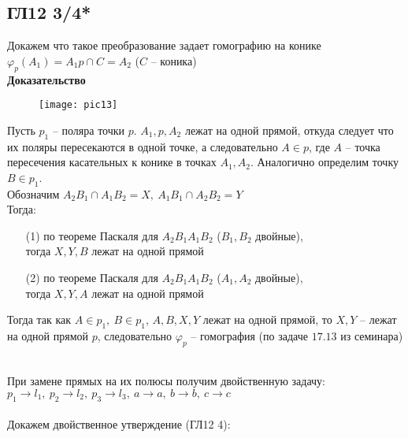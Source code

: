 \subsection*{ГЛ12 3/4*}
Докажем что такое преобразование задает гомографию на конике $\varphi_p(A_1) = A_1p \cap C = A_2$ ($C$ -- коника)\\
\textbf{Доказательство}\\
\begin{wrapfigure}{r}{0.4\textwidth}
	\texttt{[image: pic13]}
\end{wrapfigure}
Пусть $p_1$ -- поляра точки $p$. $A_1, p, A_2$ лежат на одной прямой, откуда следует что их поляры пересекаются в одной точке, а следовательно $A \in p$, где $A$ -- точка пересечения касательных к конике в точках $A_1, A_2$. Аналогично определим точку $B \in p_1$.\\
Обозначим $A_2B_1 \cap A_1B_2 = X,\ A_1B_1 \cap A_2B_2 = Y$\\
Тогда:
\begin{enumerate}
\item[(1)] по теореме Паскаля для $A_2B_1A_1B_2$ ($B_1, B_2$ двойные),\\ тогда $X,Y,B$ лежат на одной прямой
\item[(2)] по теореме Паскаля для $A_2B_1A_1B_2$ ($A_1, A_2$ двойные),\\ тогда $X,Y,A$ лежат на одной прямой
\end{enumerate}
Тогда так как $A \in p_1,\ B \in p_1$, $A,B,X,Y$ лежат на одной прямой, то $X,Y$ -- лежат на одной прямой $p$, следовательно $\varphi_p$ -- гомография (по задаче $17.13$ из семинара)\\
\begin{figure}[h!]
	\begin{minipage}[h]{0.5\linewidth}
	\end{minipage}
	\hfill
	\begin{minipage}[h]{0.5\linewidth}
	\end{minipage}
\end{figure}\\
При замене прямых на их полюсы получим двойственную задачу:\\
$p_1 \to l_1,\ p_2 \to l_2,\ p_3 \to l_3,\ a \to a,\ b \to b,\ c \to c$\\
\\
Докажем двойственное утверждение (ГЛ12 4):\\
